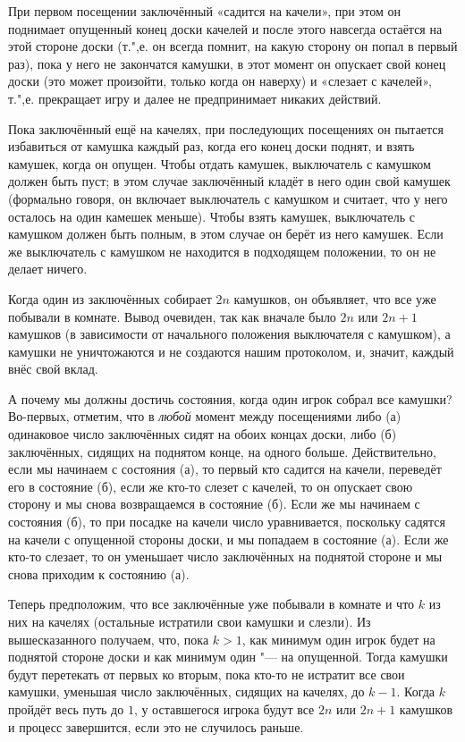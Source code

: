 \documentclass[twoside]{book}
\begin{document}
При первом посещении заключённый «садится на качели», при этом он поднимает опущенный конец доски качелей и
после этого навсегда остаётся на этой стороне доски (т.",е. он всегда помнит, на какую сторону он попал в первый раз), пока у него не закончатся камушки, в этот момент он опускает свой конец доски (это может произойти, только когда он наверху) и «слезает с качелей», т.",е. прекращает игру и далее не предпринимает никаких действий.

Пока заключённый ещё на качелях,
при последующих посещениях он пытается избавиться от камушка каждый раз, когда его конец доски поднят,
и взять камушек, когда он опущен.
Чтобы отдать камушек, выключатель с камушком должен быть пуст;
в этом случае заключённый 
кладёт в него один свой камушек (формально говоря, он включает выключатель с камушком и считает, что у него осталось на один камешек меньше).
Чтобы взять камушек, выключатель с камушком должен быть полным, в этом случае он берёт из него камушек.
Если же выключатель с камушком не находится в подходящем положении, то он не делает ничего.

Когда один из заключённых собирает $2n$ камушков, он объявляет, что все уже побывали в комнате.
Вывод очевиден, так как вначале было $2n$ или $2n+1$ камушков (в зависимости от начального положения выключателя с камушком), а камушки не уничтожаются и не создаются нашим протоколом, и, значит, каждый внёс свой вклад.

А почему мы должны достичь состояния, когда один игрок собрал все камушки?
Во-первых, отметим, что в \emph{любой} момент между посещениями либо 
(а) одинаковое число заключённых сидят на обоих концах доски, либо 
(б) заключённых, сидящих на поднятом конце, на одного больше.
Действительно, если мы начинаем с состояния (а), то первый кто садится на качели, переведёт его в состояние (б), если же кто-то слезет с качелей, то он опускает свою сторону и мы  снова возвращаемся в состояние (б).
Если же мы начинаем с состояния (б), то при посадке на качели число уравнивается, поскольку садятся на качели с опущенной стороны доски, и мы попадаем в состояние (а).
Если же кто-то слезает, то он уменьшает число заключённых на поднятой стороне и мы снова приходим к состоянию (а).

Теперь предположим, что все заключённые уже побывали в комнате и что $k$ из них на качелях (остальные истратили свои камушки и слезли).
Из вышесказанного получаем, что, пока $k>1$, как минимум один игрок будет на поднятой стороне доски и как минимум один "--- на опущенной.
Тогда камушки будут перетекать от первых ко вторым, пока кто-то не истратит все свои камушки, уменьшая число заключённых, сидящих на качелях, до $k-1$.
Когда $k$ пройдёт весь путь до $1$, у оставшегося игрока будут все $2n$ или $2n+1$ камушков и процесс завершится, если это не случилось раньше.
\heart
\end{document}
